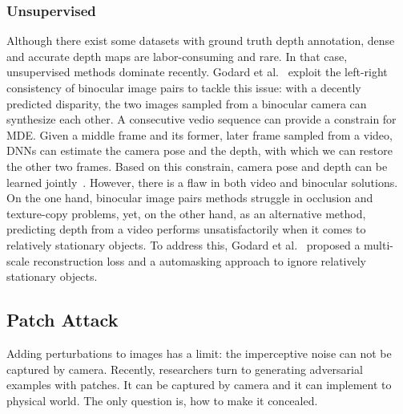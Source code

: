 \documentclass[10pt,twocolumn,letterpaper]{article}
\begin{document}
\subsubsection{Unsupervised}
Although there exist some datasets with ground truth depth 
annotation, dense and accurate depth maps are labor-consuming and rare. 
In that case, unsupervised methods dominate recently.
Godard et al.~\cite{Godard_2017_CVPR} exploit the left-right 
consistency of binocular image pairs
to tackle this issue: 
with a decently predicted disparity, 
the two images sampled from a binocular camera can synthesize each other. 
A consecutive vedio sequence can provide a constrain for MDE.
Given a middle frame and its former, later frame sampled from a video, 
DNNs can estimate the camera pose and the depth, with which we can 
restore the other two frames. Based on this constrain, camera pose 
and depth can be learned jointly~\cite{Zhou_2017_CVPR}.
However, there is a flaw in both video and binocular solutions.
On the one hand, binocular image pairs methods struggle in occlusion 
and texture-copy problems, yet, on the other hand, as an alternative method, 
predicting depth from a video performs unsatisfactorily 
when it comes to relatively stationary objects.
To address this, Godard et al.~\cite{Godard_2019_ICCV} proposed a multi-scale reconstruction
loss and a automasking approach to ignore relatively stationary objects.
\subsection{Patch Attack}
Adding perturbations to images has a limit: 
the imperceptive noise can not be captured by camera.
Recently, researchers turn to generating adversarial examples with
patches. It can be captured by camera and it can implement to physical
world. The only question is, how to make it concealed.
\end{document}
